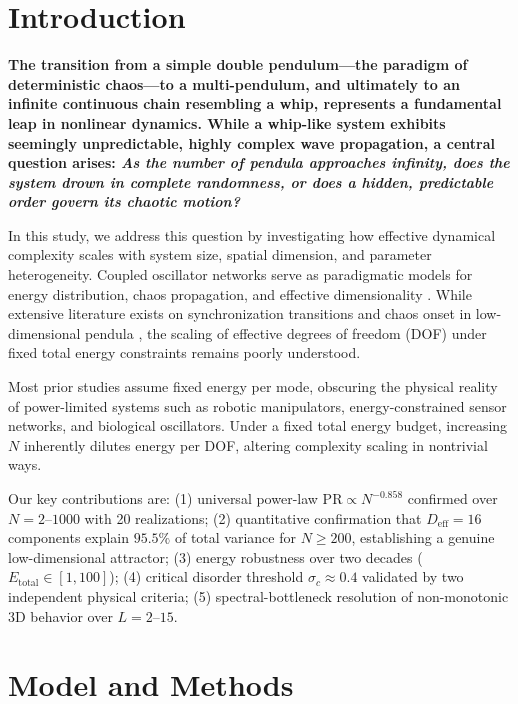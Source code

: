 \documentclass[aps,pre,12pt]{revtex4-2}
\begin{document}
\section{Introduction}

\textbf{The transition from a simple double pendulum---the paradigm of deterministic chaos---to a multi-pendulum, and ultimately to an infinite continuous chain resembling a whip, represents a fundamental leap in nonlinear dynamics. While a whip-like system exhibits seemingly unpredictable, highly complex wave propagation, a central question arises: \textit{As the number of pendula approaches infinity, does the system drown in complete randomness, or does a hidden, predictable order govern its chaotic motion?}}

In this study, we address this question by investigating how effective dynamical complexity scales with system size, spatial dimension, and parameter heterogeneity. Coupled oscillator networks serve as paradigmatic models for energy distribution, chaos propagation, and effective dimensionality \cite{strogatz2015,pikovsky2003}. While extensive literature exists on synchronization transitions \cite{acebron2005} and chaos onset in low-dimensional pendula \cite{shinbrot1992}, the scaling of effective degrees of freedom (DOF) under fixed total energy constraints remains poorly understood.

Most prior studies assume fixed energy per mode, obscuring the physical reality of power-limited systems such as robotic manipulators, energy-constrained sensor networks, and biological oscillators. Under a fixed total energy budget, increasing $N$ inherently dilutes energy per DOF, altering complexity scaling in nontrivial ways.

Our key contributions are: (1) universal power-law $\text{PR} \propto N^{-0.858}$ confirmed over $N = 2$--$1000$ with 20 realizations; (2) quantitative confirmation that $D_{\text{eff}} = 16$ components explain $95.5\%$ of total variance for $N \ge 200$, establishing a genuine low-dimensional attractor; (3) energy robustness over two decades ($E_{\text{total}} \in [1, 100]$); (4) critical disorder threshold $\sigma_c \approx 0.4$ validated by two independent physical criteria; (5) spectral-bottleneck resolution of non-monotonic 3D behavior over $L = 2$--$15$.

\section{Model and Methods}
\end{document}
